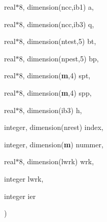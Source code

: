 {\begin{DoxyParamCaption}
\item[{real$\ast$8, dimension(ncc,ib1)}]{a, }
\item[{real$\ast$8, dimension(ncc,ib3)}]{q, }
\item[{real$\ast$8, dimension(ntest,5)}]{bt, }
\item[{real$\ast$8, dimension(npest,5)}]{bp, }
\item[{real$\ast$8, dimension({\bf m},4)}]{spt, }
\item[{real$\ast$8, dimension({\bf m},4)}]{spp, }
\item[{real$\ast$8, dimension(ib3)}]{h, }
\item[{integer, dimension(nrest)}]{index, }
\item[{integer, dimension({\bf m})}]{nummer, }
\item[{real$\ast$8, dimension(lwrk)}]{wrk, }
\item[{integer}]{lwrk, }
\item[{integer}]{ier}
\end{DoxyParamCaption}
)}\label{fpsphe_8f_a561217365244adcb2f820039bea4a107}
